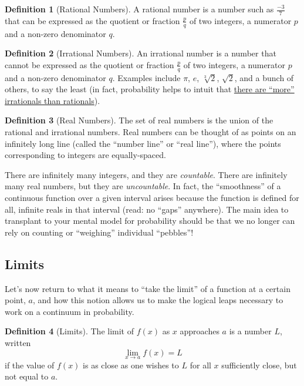 \documentclass[12pt,english]{scrartcl}
\theoremstyle{definition}
\newtheorem{definition}{Definition}[section]
\theoremstyle{remark}
\begin{document}
\begin{definition}[Rational Numbers] A rational number is a number such as
    $\frac{-3}{7}$ that can be expressed as the quotient or fraction
    $\frac{p}{q}$ of two integers, a numerator $p$ and a non-zero denominator
    $q$.
\end{definition}

\begin{definition}[Irrational Numbers] An irrational number is a number that
    cannot be expressed as the quotient or fraction $\frac{p}{q}$ of two
    integers, a numerator $p$ and a non-zero denominator $q$. Examples include
    $\pi$, $e$, $\sqrt[3]{2}$, $\sqrt{2}$, and a bunch of others, to say the
    least (in fact, probability helps to intuit that
    \href{https://math.stackexchange.com/a/474496/300506}{there are ``more''
    irrationals than rationals}).
\end{definition}

\begin{definition}[Real Numbers] The set of real numbers is the union of the rational
    and irrational numbers. Real numbers can be thought of as points on an
    infinitely long line (called the ``number line'' or ``real line''), where the points
    corresponding to integers are equally-spaced.
\end{definition}

There are infinitely many integers, and they are \textit{countable}. There are
infinitely many real numbers, but they are \textit{uncountable}. In fact, the
``smoothness'' of a continuous function over a given interval arises because
the function is defined for all, infinite reals in that interval (read: no
``gaps'' anywhere). The main idea to transplant to your mental model for
probability should be that we no longer can rely on counting or ``weighing''
individual ``pebbles''!

\subsection{Limits}%
\label{sub:limits}

Let's now return to what it means to ``take the limit'' of a function at a
certain point, $a$, and how this notion allows us to make the logical leaps
necessary to work on a continuum in probability.

\begin{definition}[Limits]
    The limit of $f(x)$ as $x$ approaches $a$ is a
    number $L$, written
    \begin{equation*}
        \lim_{x \to a} f(x) = L
    \end{equation*}
    if the value of $f(x)$ is as close as one wishes to $L$ for
    all $x$ sufficiently close, but not equal to $a$.
    \label{def:limits}
\end{definition}
\end{document}
